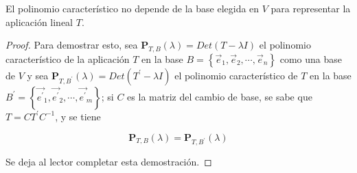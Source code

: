 \begin{theorem}
\label{polcarbase}
El polinomio característico no depende de la base elegida en $V$ para representar la aplicación lineal  $T$.


\begin{proof}


\noindent
Para demostrar esto, sea $\mathbf{P}_{T,B}(\lambda)=Det(T-\lambda I)$ el polinomio característico  de la aplicación $T$ en la base $B=\left\{\vec{e}_1,\vec{e}_2, \cdots,\vec{e}_n\right\}$ como una base de $V$ y sea  $\mathbf{P}_{T,B^{\prime}}(\lambda)=Det(T^{\prime}-\lambda I)$ el polinomio característico de $T$ en la base $B^{\prime} =\left\{\vec{e ^{\prime}}_1,\vec{ e ^{\prime}}_2,\cdots, \vec{e^{\prime}}_m\right\}$; si $C$ es la matriz del cambio de base, se  sabe que    $T=CT^\prime C^{-1}$, 
y se tiene 

\bigskip

$$\mathbf{P}_{T,B}(\lambda)=\mathbf{P}_{T,B^{\prime}}(\lambda)$$  

Se deja al lector  completar esta demostración.

\end{proof}
\end{theorem}

\bigskip

\bigskip

